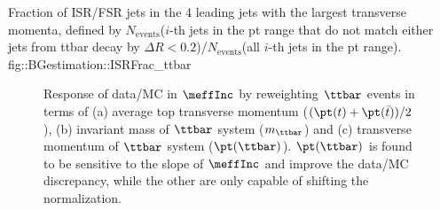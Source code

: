 {Fraction of ISR/FSR jets in the 4 leading jets with the largest transverse momenta, defined by $N_{\mathrm{events}}$($i$-th jets in the pt range that do not match either jets from ttbar decay by $\Delta R<0.2$)/$N_{\mathrm{events}}$(all $i$-th jets in the pt range).}
{fig::BGestimation::ISRFrac_ttbar}

\begin{figure}[h]
  \centering
    \caption{ Response of data/MC in $\meffInc$ by reweighting $\ttbar$ events in terms of (a) average top transverse momentum
 ($(\pt(t)+\pt(\bar{t}))/2$), (b) invariant mass of $\ttbar$ system ($m_{\ttbar}$) and (c) transverse momentum of $\ttbar$ system ($\pt(\ttbar)$). $\pt(\ttbar)$ is found to be sensitive to the slope of $\meffInc$ and improve the data/MC discrepancy, while the other are only capable of shifting the normalization. 
\label{fig::BGestimation::slope_rwgt} }
\end{figure}


